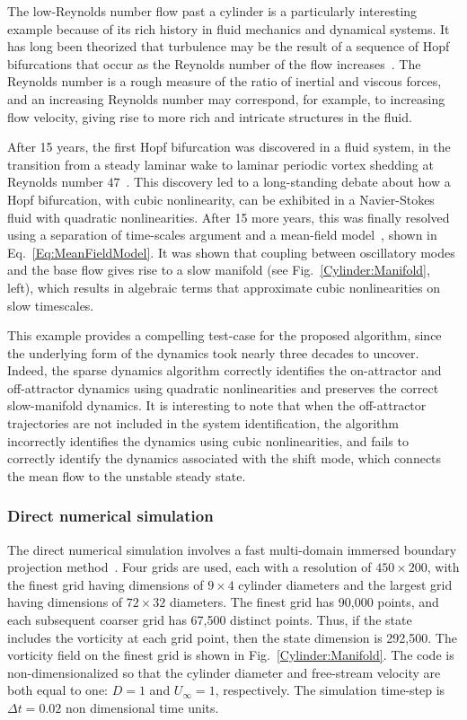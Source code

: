 \documentclass[onecolumn,11pt]{article}
\begin{document}
The low-Reynolds number flow past a cylinder is a particularly interesting example because of its rich history in fluid mechanics and dynamical systems.  It has long been theorized that turbulence may be the result of a sequence of Hopf bifurcations that occur as the Reynolds number of the flow increases~\cite{Ruelle1971cmp}.  The Reynolds number is a rough measure of the ratio of inertial and viscous forces, and an increasing Reynolds number may correspond, for example, to increasing flow velocity, giving rise to more rich and intricate structures in the fluid.  

After 15 years, the first Hopf bifurcation was discovered in a fluid system, in the transition from a steady laminar wake to laminar periodic vortex shedding at Reynolds number $47$~\cite{Jackson1987jfm,Zebib1987jem,Olinger1988prl}. 
This discovery led to a long-standing debate about how a Hopf bifurcation, with cubic nonlinearity, can be exhibited in a Navier-Stokes fluid with quadratic nonlinearities.  
After 15 more years, this was finally resolved using a separation of time-scales argument and a mean-field model~\cite{Noack2003jfm}, shown in Eq.~\eqref{Eq:MeanFieldModel}.  
It was shown that coupling between oscillatory modes and the base flow gives rise to a slow manifold (see Fig.~\ref{Cylinder:Manifold}, left), which results in algebraic terms that approximate cubic nonlinearities on slow timescales.  

This example provides a compelling test-case for the proposed algorithm, since the underlying form of the dynamics took nearly three decades to uncover.  Indeed, the sparse dynamics algorithm correctly identifies the on-attractor and off-attractor dynamics using quadratic nonlinearities and preserves the correct slow-manifold dynamics.  It is interesting to note that when the off-attractor trajectories are not included in the system identification, the algorithm incorrectly identifies the dynamics using cubic nonlinearities, and fails to correctly identify the dynamics associated with the shift mode, which connects the mean flow to the unstable steady state.  

\subsubsection{Direct numerical simulation}
 The direct numerical simulation involves a fast multi-domain immersed boundary projection method~\cite{taira:07ibfs,taira:fastIBPM}.  Four grids are used, each with a resolution of $450\times 200$, with the finest grid having dimensions of $9\times 4$ cylinder diameters and the largest grid having dimensions of $72\times 32$ diameters.  The finest grid has 90,000 points, and each subsequent coarser grid has 67,500 distinct points.  Thus, if the state includes the vorticity at each grid point, then the state dimension is 292,500.  The vorticity field on the finest grid is shown in Fig.~\ref{Cylinder:Manifold}.  The code is non-dimensionalized so that the cylinder diameter and free-stream velocity are both equal to one:  $D=1$ and $U_{\infty}=1$, respectively.  The simulation time-step is $\Delta t=0.02$ non dimensional time units.  
 
\end{document}
